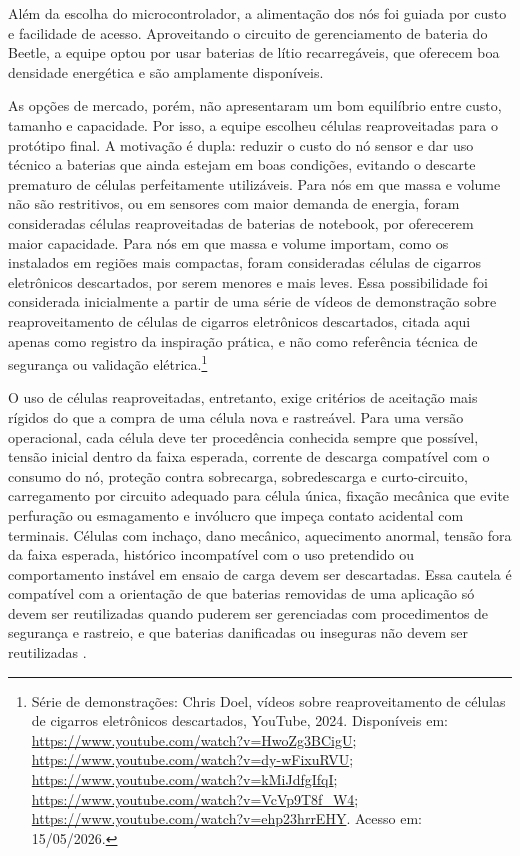 Além da escolha do microcontrolador, a alimentação dos nós foi guiada por custo e 
facilidade de acesso. Aproveitando o circuito de gerenciamento de bateria do Beetle, 
a equipe optou por usar baterias de lítio recarregáveis, que oferecem boa densidade 
energética e são amplamente disponíveis.

As opções de mercado, porém, não apresentaram um bom equilíbrio entre custo, tamanho
e capacidade. Por isso, a equipe escolheu células reaproveitadas
para o protótipo final. A motivação é dupla: reduzir o custo do nó sensor e dar uso técnico a baterias
que ainda estejam em boas condições, evitando o descarte prematuro de células
perfeitamente utilizáveis. Para nós em que massa e volume não são restritivos,
ou em sensores com maior demanda de energia, foram consideradas células
reaproveitadas de baterias de notebook, por oferecerem maior capacidade. Para nós
em que massa e volume importam, como os instalados em regiões mais compactas,
foram consideradas células de cigarros eletrônicos descartados, por serem menores
e mais leves. Essa possibilidade foi considerada inicialmente a partir de uma série de vídeos de
demonstração sobre reaproveitamento de células de cigarros eletrônicos
descartados, citada aqui apenas como registro da inspiração prática, e não como
referência técnica de segurança ou validação elétrica.\footnote{Série de
demonstrações: Chris Doel, vídeos sobre reaproveitamento de células de cigarros
eletrônicos descartados, YouTube, 2024. Disponíveis em: \url{https://www.youtube.com/watch?v=HwoZg3BCigU}; \url{https://www.youtube.com/watch?v=dy-wFixuRVU}; \url{https://www.youtube.com/watch?v=kMiJdfgIfqI}; \url{https://www.youtube.com/watch?v=VcVp9T8f_W4}; \url{https://www.youtube.com/watch?v=ehp23hrrEHY}. Acesso em: 15/05/2026.}

O uso de células reaproveitadas, entretanto, exige critérios de aceitação mais rígidos
do que a compra de uma célula nova e rastreável. Para uma versão operacional, cada
célula deve ter procedência conhecida sempre que possível, tensão inicial dentro da
faixa esperada, corrente de descarga compatível com o consumo do nó, proteção contra
sobrecarga, sobredescarga e curto-circuito, carregamento por circuito adequado para
célula única, fixação mecânica que evite perfuração ou esmagamento e invólucro que
impeça contato acidental com terminais. Células com inchaço, dano mecânico,
aquecimento anormal, tensão fora da faixa esperada, histórico incompatível com o uso
pretendido ou comportamento instável em ensaio de carga devem ser descartadas. Essa
cautela é compatível com a orientação de que baterias removidas de uma aplicação só
devem ser reutilizadas quando puderem ser gerenciadas com procedimentos de segurança
e rastreio, e que baterias danificadas ou inseguras não devem ser reutilizadas
\cite{epa_lithium_battery_recycling_faq}.

